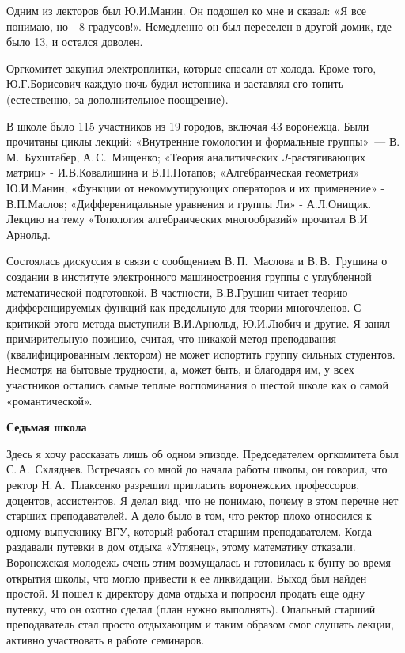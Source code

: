 Одним из лекторов был Ю.И.Манин. Он подошел ко мне и сказал: «Я все понимаю, но - 8 градусов!». Немедленно он был переселен в другой домик, где было 13, и остался доволен.

Оргкомитет закупил электроплитки, которые спасали от холода. Кроме того, Ю.Г.Борисович каждую ночь будил истопника и заставлял его топить (естественно, за дополнительное поощрение).

В школе было 115 участников из 19 городов, включая 43 воронежца.
Были прочитаны циклы лекций: «Внутренние гомологии и формальные группы»~--- В.\,М.~Бухштабер, А.\,С.~Мищенко;
«Теория аналитических $J$-растягивающих матриц» - И.В.Ковалишина и В.П.Потапов;
«Алгебраическая геометрия» Ю.И.Манин; «Функции от некоммутирующих операторов и их применение» - В.П.Маслов; «Дифференицальные уравнения и группы Ли» - А.Л.Онищик. Лекцию на тему «Топология алгебраических многообразий» прочитал В.И Арнольд.

Состоялась дискуссия в связи с сообщением В.\,П.~Маслова и В.\,В.~Грушина
о создании в институте электронного машиностроения группы с углубленной математической подготовкой.
В частности, В.В.Грушин читает теорию дифференцируемых функций как предельную для теории многочленов. С критикой этого метода выступили В.И.Арнольд, Ю.И.Любич и другие. Я занял примирительную позицию, считая, что никакой метод преподавания (квалифицированным лектором) не может испортить группу сильных студентов.
Несмотря на бытовые трудности, а, может быть, и благодаря им, у всех участников остались самые теплые воспоминания о шестой школе как о самой «романтической».

{\bf Седьмая школа}

Здесь я хочу рассказать лишь об одном эпизоде.
Председателем оргкомитета был С.\,А.~Скляднев.
Встречаясь со мной до начала работы школы, он говорил,
что ректор
\linebreak
Н.\,А.~Плаксенко разрешил пригласить воронежских профессоров, доцентов, ассистентов.
Я делал вид, что не понимаю, почему в этом перечне нет старших преподавателей. А дело было в том, что ректор плохо относился к одному выпускнику ВГУ, который работал старшим преподавателем. Когда раздавали путевки в дом отдыха «Углянец», этому математику отказали. Воронежская молодежь очень этим возмущалась и готовилась к бунту во время открытия школы, что могло привести к ее ликвидации. Выход был найден простой. Я пошел к директору дома отдыха и попросил продать еще одну путевку, что он охотно сделал (план нужно выполнять). Опальный старший преподаватель стал просто отдыхающим и таким образом смог слушать лекции, активно участвовать в работе семинаров.

